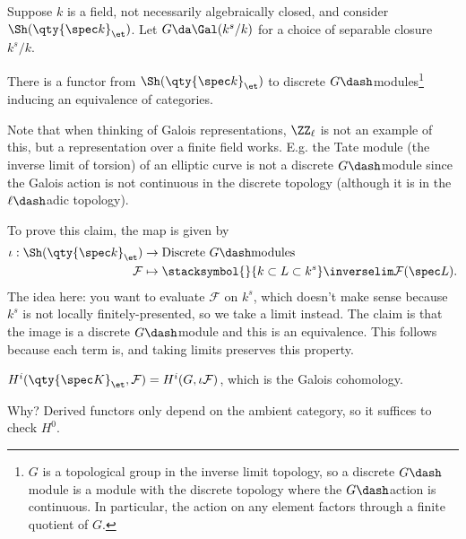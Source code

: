 \begin{example}[?]

Suppose \(k\) is a field, not necessarily algebraically closed, and
consider \(\Sh(\qty{\spec k}_\et)\). Let \(G \da \Gal(k^s/k)\) for a
choice of separable closure \(k^s/k\).

\begin{claim}

There is a functor from \(\Sh(\qty{\spec k}_\et)\) to discrete
\(G\dash\)modules\footnote{\(G\) is a topological group in the inverse
  limit topology, so a discrete \(G\dash\)module is a module with the
  discrete topology where the \(G\dash\)action is continuous. In
  particular, the action on any element factors through a finite
  quotient of \(G\).} inducing an equivalence of categories.

\end{claim}

Note that when thinking of Galois representations, \(\ZZ_{\ell}\) is not
an example of this, but a representation over a finite field works. E.g.
the Tate module (the inverse limit of torsion) of an elliptic curve is
not a discrete \(G\dash\)module since the Galois action is not
continuous in the discrete topology (although it is in the
\(\ell\dash\)adic topology).

To prove this claim, the map is given by
\begin{align*}  
\iota: \Sh(\qty{\spec k}_\et) &\to \text{Discrete $G\dash$modules} \\
\mathcal{F} &\mapsto \stacksymbol{}{k \subset L \subset k^s}\inverselim \mathcal{F}(\spec L)
.\end{align*} The idea here: you want to evaluate \(\mathcal{F}\) on
\(k^s\), which doesn't make sense because \(k^s\) is not locally
finitely-presented, so we take a limit instead. The claim is that the
image is a discrete \(G\dash\)module and this is an equivalence. This
follows because each term is, and taking limits preserves this property.

\end{example}

\begin{corollary}[?]

\(H^i(\qty{\spec K}_\et, \mathcal{F} ) = H^i(G,\iota \mathcal{F})\),
which is the Galois cohomology.

\end{corollary}

Why? Derived functors only depend on the ambient category, so it
suffices to check \(H^0\).

